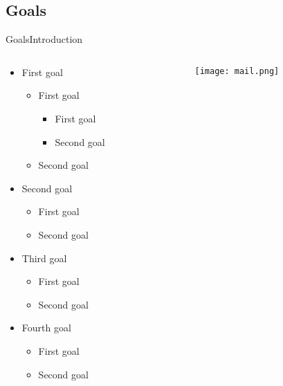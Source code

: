 \subsection*{Goals}
\begin{frame}{Goals}{Introduction}%
	\begin{columns}
		\begin{column}{0.5\textwidth}
					\begin{itemize}
				\item First goal
					\begin{itemize}
						\item First goal
						\begin{itemize}
							\item First goal
							\item Second goal
						\end{itemize}
						\item Second goal
					\end{itemize}
				\item Second goal
					\begin{itemize}
						\item First goal
						\item Second goal
					\end{itemize}
				\item Third goal
					\begin{itemize}
						\item First goal
						\item Second goal
					\end{itemize}
				\item Fourth goal
					\begin{itemize}
						\item First goal
						\item Second goal
					\end{itemize}
				\end{itemize}
							\end{column}
					\begin{column}{0.5\textwidth}
				\begin{center}
									\begin{figure}
						\texttt{[image: mail.png]}
						\caption{\label{fig:}}
					\end{figure}
									\end{center}
			\end{column}
				\end{columns}
		\end{frame}



